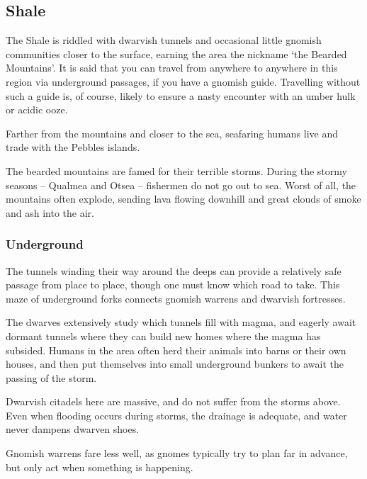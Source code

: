\begin{multicols}{2}

\subsection{Shale}

The Shale is riddled with dwarvish tunnels and occasional little gnomish communities closer to the surface, earning the area the nickname `the Bearded Mountains'.
It is said that you can travel from anywhere to anywhere in this region via underground passages, if you have a gnomish guide.
Travelling without such a guide is, of course, likely to ensure a nasty encounter with an umber hulk or acidic ooze.

Farther from the mountains and closer to the sea, seafaring humans live and trade with the Pebbles islands.

The bearded mountains are famed for their terrible storms.
During the stormy seasons -- Qualmea and Otsea -- fishermen do not go out to sea.
Worst of all, the mountains often explode, sending lava flowing downhill and great clouds of smoke and ash into the air.

\subsubsection{Underground}

The tunnels winding their way around the deeps can provide a relatively safe passage from place to place, though one must know which road to take.
This maze of underground forks connects gnomish warrens and dwarvish fortresses.

The dwarves extensively study which tunnels fill with magma, and eagerly await dormant tunnels where they can build new homes where the magma has subsided.
Humans in the area often herd their animals into barns or their own houses, and then put themselves into small underground bunkers to await the passing of the storm.

Dwarvish citadels here are massive, and do not suffer from the storms above.
Even when flooding occurs during storms, the drainage is adequate, and water never dampens dwarven shoes.

Gnomish warrens fare less well, as gnomes typically try to plan far in advance, but only act when something is happening.

\iftoggle{players}{}{
\subsubsection{Seasonal Encounters}

}
\end{multicols}
